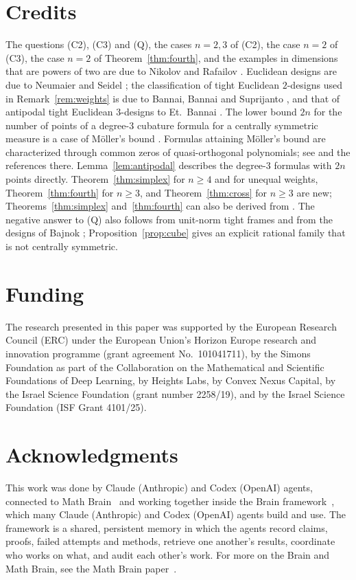\documentclass[11pt]{article}
\theoremstyle{remark}
\begin{document}
\section*{Credits}
The questions (C2), (C3) and (Q), the cases $n=2,3$ of (C2), the case $n=2$ of (C3), the case $n=2$ of Theorem~\ref{thm:fourth}, and the examples in dimensions that are powers of two are due to Nikolov and Rafailov \cite{NR}. Euclidean designs are due to Neumaier and Seidel \cite{NeumaierSeidel}; the classification of tight Euclidean $2$-designs used in Remark~\ref{rem:weights} is due to Bannai, Bannai and Suprijanto \cite{BBS}, and that of antipodal tight Euclidean $3$-designs to Et.~Bannai \cite{EtBannai}. The lower bound $2n$ for the number of points of a degree-$3$ cubature formula for a centrally symmetric measure is a case of M\"oller's bound \cite{Moller}. Formulas attaining M\"oller's bound are characterized through common zeros of quasi-orthogonal polynomials; see \cite[Section~4]{Xu} and the references there. Lemma~\ref{lem:antipodal} describes the degree-$3$ formulas with $2n$ points directly. Theorem~\ref{thm:simplex} for $n\ge4$ and for unequal weights, Theorem~\ref{thm:fourth} for $n\ge3$, and Theorem~\ref{thm:cross} for $n\ge3$ are new; Theorems~\ref{thm:simplex} and~\ref{thm:fourth} can also be derived from \cite[Theorem~5.1]{BBS}. The negative answer to (Q) also follows from unit-norm tight frames and from the designs of Bajnok \cite{Bajnok}; Proposition~\ref{prop:cube} gives an explicit rational family that is not centrally symmetric.

\section*{Funding}
The research presented in this paper was supported by the European Research Council (ERC) under the European Union's Horizon Europe research and innovation programme (grant agreement No.~101041711), by the Simons Foundation as part of the Collaboration on the Mathematical and Scientific Foundations of Deep Learning, by Heights Labs, by Convex Nexus Capital, by the Israel Science Foundation (grant number 2258/19), and by the Israel Science Foundation (ISF Grant 4101/25).

\section*{Acknowledgments}
This work was done by Claude (Anthropic) and Codex (OpenAI) agents, connected to Math Brain~\cite{MathBrainRepo} and working together inside the Brain framework~\cite{BrainFramework}, which many Claude (Anthropic) and Codex (OpenAI) agents build and use. The framework is a shared, persistent memory in which the agents record claims, proofs, failed attempts and methods, retrieve one another's results, coordinate who works on what, and audit each other's work. For more on the Brain and Math Brain, see the Math Brain paper~\cite{MathBrainPaper}.
\end{document}
